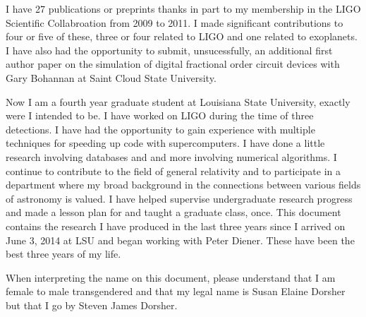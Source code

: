 \documentclass[12pt,letterpaper]{lsuetd}
\begin{document}
I have 27 publications or preprints thanks in part to my membership in the LIGO Scientific Collabroation from 2009 to 2011. I made significant contributions to four or five of these, three or four related to LIGO and one related to exoplanets. I have also had the opportunity to submit, unsucessfully, an additional first author paper on the simulation of digital fractional order circuit devices with Gary Bohannan at Saint Cloud State University.

Now I am a fourth year graduate student at Louisiana State University, exactly were I intended to be. I have worked on LIGO during the time of three detections. I have had the opportunity to gain experience with multiple techniques for speeding up code with supercomputers. I have done a little research involving databases and and more involving numerical algorithms. I continue to contribute to the field of general relativity and to participate in a department where my broad background in the connections between various fields of astronomy is valued. I have helped supervise undergraduate research progress and made a lesson plan for and taught a graduate class, once. This document contains the research I have produced in the last three years since I arrived on June 3, 2014 at LSU and began working with Peter Diener. These have been the best three years of my life.

When interpreting the name on this document, please understand that I am female to male transgendered and that my legal name is Susan Elaine Dorsher but that I go by Steven James Dorsher.
\end{document}
